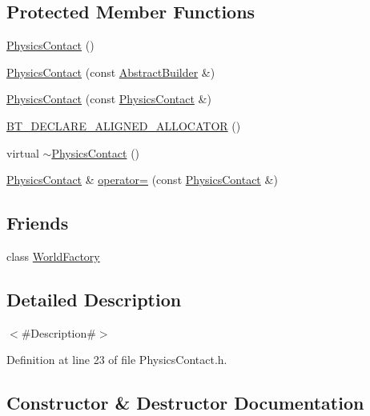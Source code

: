 \subsection*{Protected Member Functions}
\begin{DoxyCompactItemize}
\item 
\mbox{\hyperlink{classnjli_1_1_physics_contact_a53734d054c26b23065f2b994e9f8153f}{Physics\+Contact}} ()
\item 
\mbox{\hyperlink{classnjli_1_1_physics_contact_a31d3673b8451cfe4ea8c0c2e3436a593}{Physics\+Contact}} (const \mbox{\hyperlink{classnjli_1_1_abstract_builder}{Abstract\+Builder}} \&)
\item 
\mbox{\hyperlink{classnjli_1_1_physics_contact_a1bb94f2e84e93ae7060f5d0d6edc20c8}{Physics\+Contact}} (const \mbox{\hyperlink{classnjli_1_1_physics_contact}{Physics\+Contact}} \&)
\item 
\mbox{\hyperlink{classnjli_1_1_physics_contact_a0a658bc8a36f2dca0cf9db21627b9d29}{B\+T\+\_\+\+D\+E\+C\+L\+A\+R\+E\+\_\+\+A\+L\+I\+G\+N\+E\+D\+\_\+\+A\+L\+L\+O\+C\+A\+T\+OR}} ()
\item 
virtual \mbox{\hyperlink{classnjli_1_1_physics_contact_aadf83ef4d40400730114a68f853e42c3}{$\sim$\+Physics\+Contact}} ()
\item 
\mbox{\hyperlink{classnjli_1_1_physics_contact}{Physics\+Contact}} \& \mbox{\hyperlink{classnjli_1_1_physics_contact_a7bb830268bd86140800930cdde5c5cc7}{operator=}} (const \mbox{\hyperlink{classnjli_1_1_physics_contact}{Physics\+Contact}} \&)
\end{DoxyCompactItemize}
\subsection*{Friends}
\begin{DoxyCompactItemize}
\item 
class \mbox{\hyperlink{classnjli_1_1_physics_contact_acb96ebb09abe8f2a37a915a842babfac}{World\+Factory}}
\end{DoxyCompactItemize}


\subsection{Detailed Description}
$<$\#\+Description\#$>$ 

Definition at line 23 of file Physics\+Contact.\+h.



\subsection{Constructor \& Destructor Documentation}
\mbox{\label{classnjli_1_1_physics_contact_a53734d054c26b23065f2b994e9f8153f}} 
